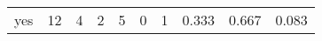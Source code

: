 \begin{longtable}{lp{2.0cm}p{2.0cm}p{2.0cm}p{2.0cm}p{2.0cm}p{2.0cm}p{2.0cm}p{2.0cm}p{2.0cm}}
yes       &                     12 &                                             4 &                                            2 &                                           5 &                                            0 &                                          1 &                                0.333 &                                  0.667 &                                0.083 \\
\end{longtable}
